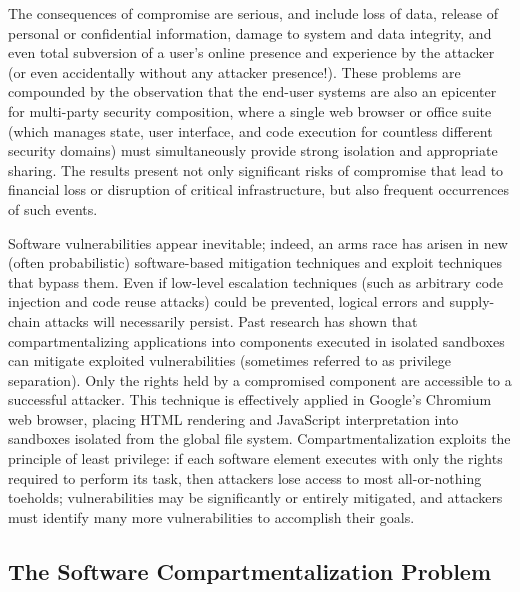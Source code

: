 The consequences of compromise are serious, and include loss of data, release of
personal or confidential information, damage to system and data integrity, and even total
subversion of a user's online presence and experience by the attacker (or even
accidentally without any attacker presence!).
These problems are compounded by the observation that the end-user systems are also an
epicenter for multi-party security composition, where a single web browser or office suite
(which manages state, user interface, and code execution for countless different security domains)
must simultaneously provide strong isolation and appropriate sharing.
The results present not only significant risks of compromise that lead to financial loss or
disruption of critical infrastructure, but also frequent occurrences of such events.

Software vulnerabilities appear inevitable; 
indeed, an arms race has arisen in new
(often probabilistic) software-based mitigation techniques and exploit
techniques that bypass them.
Even if low-level escalation techniques (such as arbitrary code injection and
code reuse attacks) could be prevented, logical errors and supply-chain
attacks will necessarily persist.
Past research has shown that compartmentalizing applications into components executed
in isolated sandboxes can mitigate exploited vulnerabilities (sometimes referred to as privilege
separation).
Only the rights held by a compromised component are accessible to a successful attacker.
This technique is effectively applied in Google's Chromium web browser, placing HTML
rendering and JavaScript interpretation into sandboxes isolated from the global file system.
Compartmentalization exploits the principle of least privilege: if each software element executes with
only the rights required to perform its task, then attackers lose access to most all-or-nothing
toeholds; vulnerabilities may be significantly or entirely mitigated, and attackers must identify
many more vulnerabilities to accomplish their goals.

\subsection{The Software Compartmentalization Problem}

